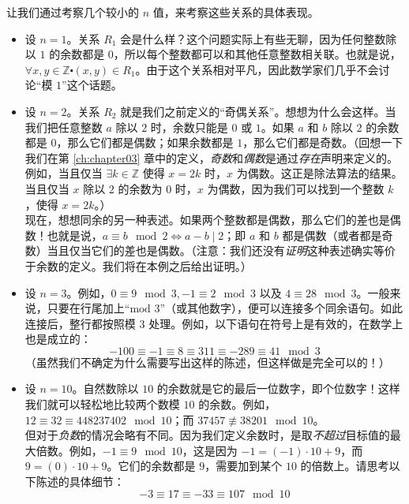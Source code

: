 \begin{example}
    让我们通过考察几个较小的 $n$ 值，来考察这些关系的具体表现。

    \begin{itemize}
        \item 设 $n=1$。关系 $R_1$ 会是什么样？这个问题实际上有些无聊，因为任何整数除以 $1$ 的余数都是 $0$，所以每个整数都可以和其他任意整数相关联。也就是说，$\forall x,y \in \mathbb{Z} \centerdot (x, y) \in R_1$。由于这个关系相对平凡，因此数学家们几乎不会讨论``模 $1$''这个话题。
        
        \item 设 $n=2$。关系 $R_2$ 就是我们之前定义的``奇偶关系''。想想为什么会这样。当我们把任意整数 $a$ 除以 $2$ 时，余数只能是 $0$ 或 $1$。如果 $a$ 和 $b$ 除以 $2$ 的余数都是 $0$，那么它们都是偶数；如果余数都是 $1$，那么它们都是奇数。（回想一下我们在第 \ref{ch:chapter03} 章中的定义，\emph{奇数}和\emph{偶数}是通过\emph{存在}声明来定义的。例如，当且仅当 $\exists k \in \mathbb{Z}$ 使得 $x = 2k$ 时，$x$ 为偶数。这正是除法算法的结果。当且仅当 $x$ 除以 $2$ 的余数为 $0$ 时，$x$ 为偶数，因为我们可以找到一个整数 $k$，使得 $x = 2k$。）\\
        现在，想想同余的另一种表述。如果两个整数都是偶数，那么它们的差也是偶数！也就是说，$a \equiv b \mod 2 \iff a - b \mid 2$；即 $a$ 和 $b$ 都是偶数（或者都是奇数）当且仅当它们的差也是偶数。（注意：我们还没有\emph{证明}这种表述确实等价于余数的定义。我们将在本例之后给出证明。）

        \item 设 $n=3$。例如，$0 \equiv 9 \mod 3, -1 \equiv 2 \mod 3$ 以及 $4 \equiv 28 \mod 3$。一般来说，只要在行尾加上``$\text{mod\ } 3$''（或其他数字），便可以连接多个同余语句。如此连接后，整行都按照模 $3$ 处理。例如，以下语句在符号上是有效的，在数学上也是成立的：
        \[-100 \equiv -1 \equiv 8 \equiv 311 \equiv -289 \equiv 41 \mod 3\]
        （虽然我们不确定为什么需要写出这样的陈述，但这样做是完全可以的！）

        \item 设 $n=10$。自然数除以 $10$ 的余数就是它的最后一位数字，即个位数字！这样我们就可以轻松地比较两个数模 $10$ 的余数。例如，$12 \equiv 32 \equiv 448237402 \mod 10$；而 $37457 \not\equiv 38201 \mod 10$。\\
        但对于\emph{负数}的情况会略有不同。因为我们定义余数时，是取\emph{不超过}目标值的最大倍数。例如，$-1 \equiv 9 \mod 10$，这是因为 $-1= (-1) \cdot 10 + 9$，而 $9 = (0) \cdot 10 + 9$。它们的余数都是 $9$，需要加到某个 $10$ 的倍数上。请思考以下陈述的具体细节：
        \[-3 \equiv 17 \equiv -33 \equiv 107 \mod 10\]
    \end{itemize}
\end{example}


